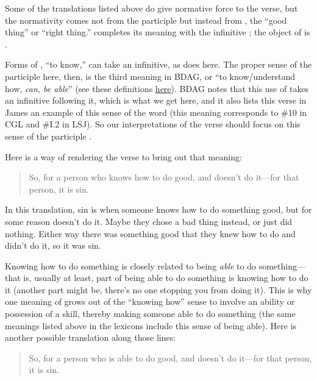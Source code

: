 				Some of the translations listed above do give normative force to the verse,
					but the normativity comes not from the participle  but instead from ,
						the ``good thing'' or ``right thing.''
				 completes its meaning with the infinitive ;
					the object of  is .
				
				Forms of ,
					``to know,''
						can take an infinitive,
							as  does here.
				The proper sense of the participle here,
					then,
						is the third meaning in BDAG,
							or ``to know/understand how, \textit{can, be able}'' (see these definitions \hyperref[OIDA]{here}).
				BDAG notes that this use of  takes an infinitive following it,
					which is what we get here,
						and it also lists this verse in James an example of this sense of the word (this meaning corresponds to \#10 in CGL and \#I.2 in LSJ).
				So our interpretations of the verse should focus on this sense of the participle .
				
				Here is a way of rendering the verse to bring out that meaning:
				
					\begin{quote}
						So, for a person who knows how to do good, and doesn't do it---for that person, it is sin.
					\end{quote}
					
				\noindent In this translation,
					sin is when someone knows how to do something good,
						but for some reason doesn't do it. 
				Maybe they chose a bad thing instead,
					or just did nothing.
				Either way there was something good that they knew how to do and didn't do it,
					so it was sin.
					
				Knowing how to do something is closely related to being \textit{able} to do something---%
					that is,
						usually at least,
							part of being able to do something is knowing how to do it (another part might be, there's no one stopping you from doing it).
				This is why one meaning of  grows out of the ``knowing how'' sense to involve an ability or possession of a skill,
					thereby making someone able to do something (the same meanings listed above in the lexicons include this sense of being able).
				Here is another possible translation along those lines:
				
					\begin{quote}
						So, for a person who is able to do good, and doesn't do it---for that person, it is sin.
					\end{quote}
					
